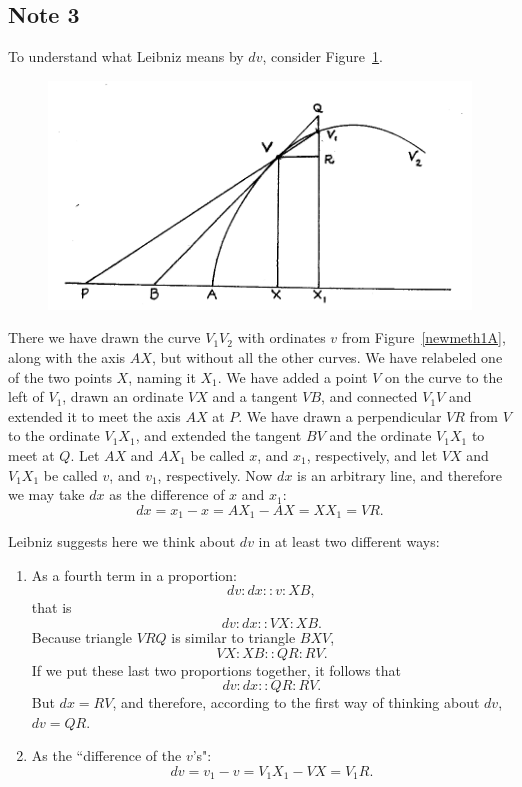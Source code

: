 \documentclass[twoside,openright]{article}
\begin{document}
\subsection*{Note 3}
\label{cnm3}

To understand what Leibniz means by $dv$, consider Figure~\ref{dv}.  
\begin{figure}[htp]
\begin{center}
\includegraphics[width=.75\textwidth]{fig/Figure3}
\caption{}
\label{dv}
\vspace{-10pt}
\end{center}
\end{figure}
There we have drawn the curve $V_1V_2$ with ordinates $v$ from
Figure~\ref{newmeth1A}, along with the axis $AX$, but without all the
other curves.  We have relabeled one of the two points $X$, naming it
$X_1$.  We have added a point $V$ on the curve to the left of $V_1$,
drawn an ordinate $VX$ and a tangent $VB$, and connected $V_1V$ and
extended it to meet the axis $AX$ at $P$.  We have drawn a
perpendicular $VR$ from $V$ to the ordinate $V_1X_1$, and extended the
tangent $BV$ and the ordinate $V_1X_1$ to meet at $Q$.  Let $AX$ and
$AX_1$ be called $x$, and $x_1$, respectively, and let $VX$ and
$V_1X_1$ be called $v$, and $v_1$, respectively.  Now $dx$ is an
arbitrary line, and therefore we may take $dx$ as the difference of
$x$ and $x_1$:
$$dx = x_1 -x = AX_1 - AX = XX_1 = VR.$$

Leibniz suggests here we think about $dv$ in at least two different ways:
\begin{enumerate}
\item As a fourth term in a proportion:
$$dv\!:\!dx :: v \!:\! XB,$$ 
that is
$$dv\!:\!dx :: VX \!:\! XB.$$
Because triangle $VRQ$ is similar to triangle $BXV$,
$$ VX \!:\! XB :: QR\!:\!RV.$$
If we put these last two proportions together, it follows that
$$dv\!:\!dx :: QR\!:\!RV.$$
But $dx = RV$, and therefore, according to the first way of thinking about $dv$, $dv = QR$.

\item As the ``difference of the $v$'s":
$$dv  = v_1 - v = V_1X_1 - VX = V_1R.$$
\end{enumerate}
\end{document}
